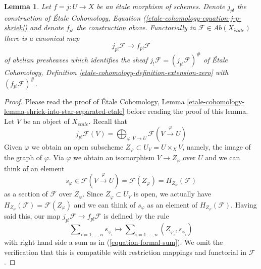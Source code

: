 \documentclass{stacks-project}
\theoremstyle{plain}
\newtheorem{lemma}[subsection]{Lemma}
\theoremstyle{definition}
\theoremstyle{remark}
\numberwithin{equation}{subsection}
\def\etale{{\acute{e}tale}}
\begin{document}
\begin{lemma}
\label{lemma-finite-support-etale-shriek}
Let $f = j : U \to X$ be an \'etale morphism of schemes. Denote $j_{p!}$
the construction of \'Etale Cohomology, Equation
(\ref{etale-cohomology-equation-j-p-shriek})
and denote $f_{p!}$ the construction above. Functorially in
$\mathcal{F} \in \textit{Ab}(X_\etale)$ there is a canonical map
$$
j_{p!}\mathcal{F} \longrightarrow f_{p!}\mathcal{F}
$$
of abelian presheaves which identifies the sheaf
$j_!\mathcal{F} = (j_{p!}\mathcal{F})^\#$ of \'Etale Cohomology,
Definition \ref{etale-cohomology-definition-extension-zero}
with $(f_{p!}\mathcal{F})^\#$.
\end{lemma}

\begin{proof}
Please read the proof of \'Etale Cohomology, Lemma
\ref{etale-cohomology-lemma-shriek-into-star-separated-etale}
before reading the proof of this lemma.
Let $V$ be an object of $X_\etale$. Recall that
$$
j_{p!}\mathcal{F}(V) =
\bigoplus\nolimits_{\varphi : V \to U} \mathcal{F}(V \xrightarrow{\varphi} U)
$$
Given $\varphi$ we obtain an open subscheme
$Z_\varphi \subset U_V = U \times_X V$, namely,
the image of the graph of $\varphi$. Via $\varphi$
we obtain an isomorphism $V \to Z_\varphi$ over $U$
and we can think of an element
$$
s_\varphi \in \mathcal{F}(V \xrightarrow{\varphi} U) =
\mathcal{F}(Z_\varphi) = H_{Z_\varphi}(\mathcal{F})
$$
as a section of $\mathcal{F}$ over $Z_{\varphi}$. Since
$Z_\varphi \subset U_V$ is open, we actually have
$H_{Z_\varphi}(\mathcal{F}) = \mathcal{F}(Z_\varphi)$
and we can think of $s_\varphi$ as an element of $H_{Z_\varphi}(\mathcal{F})$.
Having said this, our map $j_{p!}\mathcal{F} \to f_{p!}\mathcal{F}$
is defined by the rule
$$
\sum\nolimits_{i = 1, \ldots, n} s_{\varphi_i}
\longmapsto
\sum\nolimits_{i = 1, \ldots, n} (Z_{\varphi_i}, s_{\varphi_i})
$$
with right hand side a sum as in (\ref{equation-formal-sum}).
We omit the verification that this is compatible with restriction
mappings and functorial in $\mathcal{F}$.


\end{proof}
\end{document}
